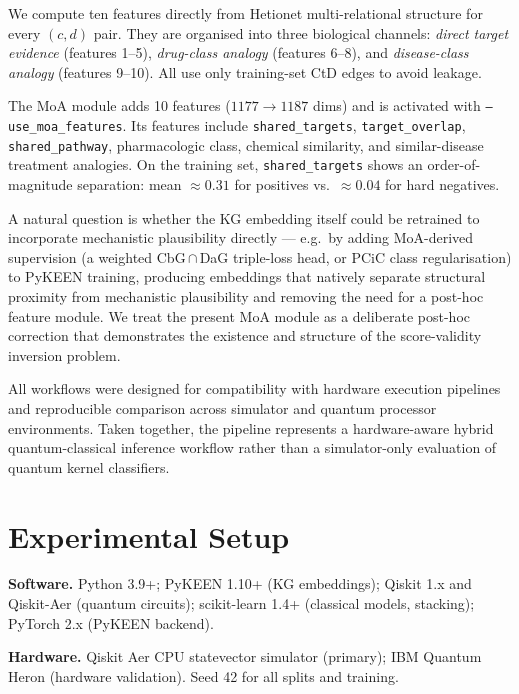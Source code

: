 We compute ten features directly from Hetionet multi-relational structure for
every $(c,d)$ pair.
They are organised into three biological channels: \emph{direct target evidence}
(features 1--5), \emph{drug-class analogy} (features 6--8), and
\emph{disease-class analogy} (features 9--10).
All use only training-set CtD edges to avoid leakage.

The MoA module adds 10 features ($1177\to1187$ dims) and is activated with
\texttt{--use\_moa\_features}.
Its features include \texttt{shared\_targets}, \texttt{target\_overlap},
\texttt{shared\_pathway}, pharmacologic class, chemical similarity, and
similar-disease treatment analogies. On the training set,
\texttt{shared\_targets} shows an order-of-magnitude separation:
mean $\approx0.31$ for positives vs.\ $\approx0.04$ for hard negatives.

A natural question is whether the KG embedding itself could be retrained to
incorporate mechanistic plausibility directly --- e.g.\ by adding MoA-derived
supervision (a weighted CbG\,$\cap$\,DaG triple-loss head, or PCiC class
regularisation) to PyKEEN training, producing embeddings that natively
separate structural proximity from mechanistic plausibility and removing the
need for a post-hoc feature module. We treat the present MoA module as a
deliberate post-hoc correction that demonstrates the existence and structure
of the score-validity inversion problem.

All workflows were designed for compatibility with hardware execution
pipelines and reproducible comparison across simulator and quantum processor
environments.
Taken together, the pipeline represents a hardware-aware hybrid
quantum-classical inference workflow rather than a simulator-only evaluation
of quantum kernel classifiers.
\fi

\section{Experimental Setup}
\label{sec:experimental}

\textbf{Software.} Python 3.9+; PyKEEN 1.10+ (KG embeddings); Qiskit 1.x and
Qiskit-Aer (quantum circuits); scikit-learn 1.4+ (classical models, stacking);
PyTorch 2.x (PyKEEN backend).

\textbf{Hardware.} Qiskit Aer CPU statevector simulator (primary); IBM Quantum
Heron (hardware validation). Seed 42 for all splits and training.

